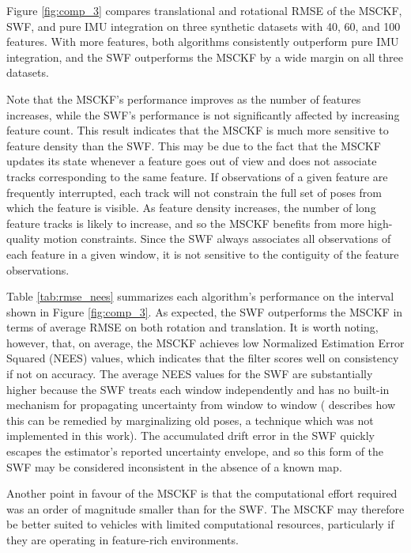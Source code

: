 \documentclass[letterpaper, 10 pt, conference]{ieeeconf}  %
\begin{document}
Figure \ref{fig:comp_3} compares translational and rotational RMSE of the MSCKF, SWF, and pure IMU integration on three synthetic datasets with 40, 60, and 100 features.
With more features, both algorithms consistently outperform pure IMU integration, and the SWF outperforms the MSCKF by a wide margin on all three datasets.

Note that the MSCKF's performance improves as the number of features increases, while the SWF's performance is not significantly affected by increasing feature count.
This result indicates that the MSCKF is much more sensitive to feature density than the SWF.
This may be due to the fact that the MSCKF updates its state whenever a feature goes out of view and does not associate tracks corresponding to the same feature.
If observations of a given feature are frequently interrupted, each track will not constrain the full set of poses from which the feature is visible.
As feature density increases, the number of long feature tracks is likely to increase, and so the MSCKF benefits from more high-quality motion constraints.
Since the SWF always associates all observations of each feature in a given window, it is not sensitive to the contiguity of the feature observations.

Table \ref{tab:rmse_nees} summarizes each algorithm's performance on the interval shown in Figure \ref{fig:comp_3}.
As expected, the SWF outperforms the MSCKF in terms of average RMSE on both rotation and translation.
It is worth noting, however, that, on average, the MSCKF achieves low Normalized Estimation Error Squared (NEES) values, which indicates that the filter scores well on consistency if not on accuracy.
The average NEES values for the SWF are substantially higher because the SWF treats each window independently and has no built-in mechanism for propagating uncertainty from window to window (\cite{Sibley:2010:JFR} describes how this can be remedied by marginalizing old poses, a technique which was not implemented in this work).
The accumulated drift error in the SWF quickly escapes the estimator's reported uncertainty envelope, and so this form of the SWF may be considered inconsistent in the absence of a known map.

Another point in favour of the MSCKF is that the computational effort required was an order of magnitude smaller than for the SWF.
The MSCKF may therefore be better suited to vehicles with limited computational resources, particularly if they are operating in feature-rich environments.
\end{document}
